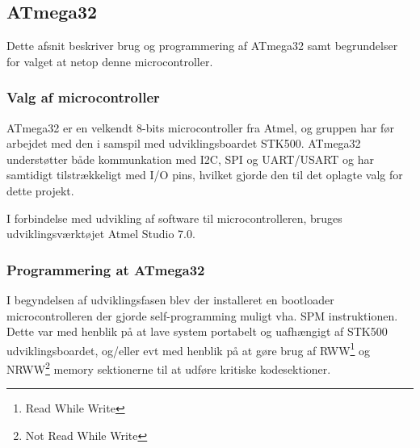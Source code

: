 \subsection{ATmega32}

Dette afsnit beskriver brug og programmering af ATmega32 samt begrundelser for valget at netop denne microcontroller.

\subsubsection{Valg af microcontroller}

ATmega32 er en velkendt 8-bits microcontroller fra Atmel, og gruppen har før arbejdet med den i samspil med udviklingsboardet STK500.
ATmega32 understøtter både kommunkation med I2C, SPI og UART/USART og har samtidigt tilstrækkeligt med I/O pins, hvilket gjorde den til det oplagte valg for dette projekt.

I forbindelse med udvikling af software til microcontrolleren, bruges udviklingsværktøjet Atmel Studio 7.0.

\subsubsection{Programmering at ATmega32}

I begyndelsen af udviklingsfasen blev der installeret en bootloader microcontrolleren der 
gjorde self-programming muligt vha. SPM instruktionen. Dette var med henblik på at lave system portabelt 
og uafhængigt af STK500 udviklingsboardet, og/eller evt med henblik på at gøre brug af RWW\footnote{Read While Write} og 
NRWW\footnote{Not Read While Write} memory sektionerne til at udføre kritiske kodesektioner.



